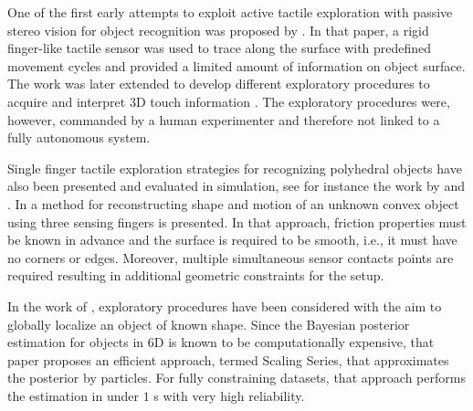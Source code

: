 
One of the first early attempts to exploit active tactile exploration with passive stereo vision for object recognition was proposed by \citet{Allen1987Robotic}. In that paper, a rigid finger-like tactile sensor was used to trace along the surface with predefined movement cycles and provided a limited amount of information on object surface. The work was later extended to develop different exploratory procedures to acquire and interpret 3D touch information \citet{Allen1990Acquisition}. The exploratory procedures were, however, commanded by a human experimenter and therefore not linked to a fully autonomous system.

Single finger tactile exploration strategies for recognizing polyhedral objects have also been presented and evaluated in simulation, see for instance the work by \citet{Roberts1990ICRA} and \citet{Caselli1996ICRA}. In \citet{Moll2003STAR} a method for reconstructing shape and motion of an unknown convex object using three sensing fingers is presented. In that approach, friction properties must be known in advance and the surface is required to be smooth, i.e., it must have no corners or edges. Moreover, multiple simultaneous sensor contacts points are required resulting in additional geometric constraints for the setup.


In the work of \citet{Petrovskaya2011Global}, exploratory procedures have been considered with the aim to globally localize an object of known shape. Since the Bayesian posterior estimation for objects in 6D is known to be computationally expensive, that paper proposes an efficient approach, termed Scaling Series, that approximates the posterior by particles. For fully constraining datasets, that approach performs the estimation in under $1$ s with very high reliability.

